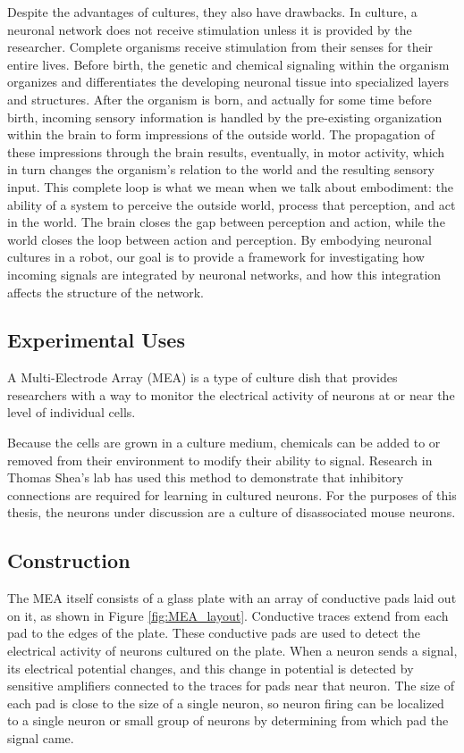 \documentclass[letterpaper]{article}
\begin{document}
Despite the advantages of cultures, they also have drawbacks. 
In culture, a neuronal network does not receive stimulation unless it is provided by the researcher. 
Complete organisms receive stimulation from their senses for their entire lives. 
Before birth, the genetic and chemical signaling within the organism organizes and differentiates the developing neuronal tissue into specialized layers and structures. 
After the organism is born, and actually for some time before birth, incoming sensory information is handled by the pre-existing organization within the brain to form impressions of the outside world. 
The propagation of these impressions through the brain results, eventually, in motor activity, which in turn changes the organism's relation to the world and the resulting sensory input. 
This complete loop is what we mean when we talk about embodiment: the ability of a system to perceive the outside world, process that perception, and act in the world. 
The brain closes the gap between perception and action, while the world closes the loop between action and perception. 
By embodying neuronal cultures in a robot, our goal is to provide a framework for investigating how incoming signals are integrated by neuronal networks, and how this integration affects the structure of the network. 

\subsection{Experimental Uses}

A Multi-Electrode Array (MEA) is a type of culture dish that provides researchers with a way to monitor the electrical activity of neurons at or near the level of individual cells. 

Because the cells are grown in a culture medium, chemicals can be added to or removed from their environment to modify their ability to signal. 
Research in Thomas Shea's lab \cite{shea2009optimization} has used this method to demonstrate that inhibitory connections are required for learning in cultured neurons. 
For the purposes of this thesis, the neurons under discussion are a culture of disassociated mouse neurons.   

\subsection{Construction}
The MEA itself consists of a glass plate with an array of conductive pads laid out on it, as shown in Figure \ref{fig:MEA_layout}.
Conductive traces extend from each pad to the edges of the plate. 
These conductive pads are used to detect the electrical activity of neurons cultured on the plate.
When a neuron sends a signal, its electrical potential changes, and this change in potential is detected by sensitive amplifiers connected to the traces for pads near that neuron.
The size of each pad is close to the size of a single neuron, so neuron firing can be localized to a single neuron or small group of neurons by determining from which pad the signal came.
\end{document}
